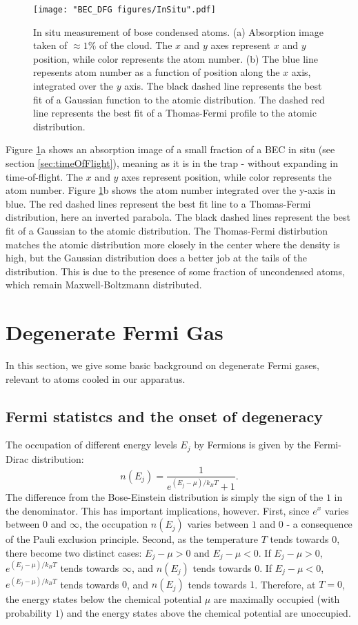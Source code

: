 \begin{figure}
	\texttt{[image: "BEC\_DFG figures/InSitu".pdf]}
\caption[In situ measurement of a fraction of bose condensed atoms]{In situ measurement of bose condensed atoms. (a) Absorption image taken of $\approx1\%$ of the cloud. The $x$ and $y$ axes represent $x$ and $y$ position, while color represents the atom number. (b) The blue line repesents atom number as a function of position along the $x$ axis, integrated over the $y$ axis. The black dashed line represents the best fit of a Gaussian function to the atomic distribution. The dashed red line represents the best fit of a Thomas-Fermi profile to the atomic distribution.}
\label{fig:InSitu}
\end{figure}

Figure \ref{fig:InSitu}a shows an absorption image of a small fraction of a BEC in situ (see section \ref{sec:timeOfFlight}), meaning as it is in the trap - without expanding in time-of-flight. The $x$ and $y$ axes represent position, while color represents the atom number. Figure \ref{fig:InSitu}b shows the atom number integrated over the y-axis in blue. The red dashed lines represent the best fit line to a Thomas-Fermi distribution, here an inverted parabola. The black dashed lines represent the best fit of a Gaussian to the atomic distribution. The Thomas-Fermi distirbution matches the atomic distribution more closely in the center where the density is high, but the Gaussian distribution does a better job at the tails of the distribution. This is due to the presence of some fraction of uncondensed atoms, which remain Maxwell-Boltzmann distributed. 


\section{Degenerate Fermi Gas}\label{sec:DFGintro}
In this section, we give some basic background on degenerate Fermi gases, relevant to \K{} atoms cooled in our apparatus. 

\subsection{Fermi statistcs and the onset of degeneracy}
The occupation of different energy levels $E_j$ by Fermions is given by the Fermi-Dirac distribution:
\begin{equation}
n(E_j)= \frac{1}{e^{(E_j-\mu)/k_BT}+1}.
\end{equation}
The difference from the Bose-Einstein distribution is simply the sign of the $1$ in the denominator. This has important implications, however. First, since $e^x$ varies between $0$ and $\infty$, the occupation $n(E_j)$ varies between $1$ and $0$ - a consequence of the Pauli exclusion principle. Second, as the temperature $T$ tends towards $0$, there become two distinct cases: $E_j-\mu>0$ and $E_j-\mu<0$. If $E_j-\mu>0$, $e^{(E_j-\mu)/k_BT}$ tends towards $\infty$, and $n(E_j)$ tends towards $0$. If  $E_j-\mu<0$, $e^{(E_j-\mu)/k_BT}$ tends towards $0$, and $n(E_j)$ tends towards $1$. Therefore, at $T=0$, the energy states below the chemical potential $\mu$ are maximally occupied (with probability $1$) and the energy states above the chemical potential are unoccupied. 


